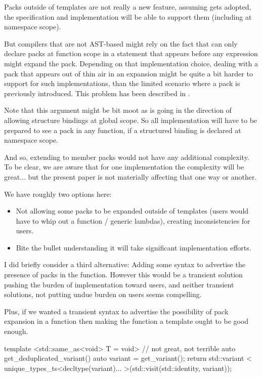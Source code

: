 \documentclass{wg21}
\begin{document}
Packs outside of templates are not really a new feature, assuming  gets adopted, the specification
and implementation will be able to support them (including at namespace scope).

But compilers that are not AST-based might rely on the fact that  can only declare packs at function scope in a statement that appears
before any expression might expand the pack.
Depending on that implementation choice, dealing with a pack that appears out of thin air in an expansion might be quite a bit harder to
support for such implementations, than the limited scenario where a pack is previously introduced.
This problem has been described in .

Note that this argument might be bit moot as  is going in the direction of allowing structure bindings at global scope.
So all implementation will have to be prepared to see a pack in any function, if a structured binding is declared at namespace scope.

And so, extending to member packs would not have any additional complexity.
To be clear, we are aware that for one implementation the complexity will be great... but the present paper is not materially affecting that one way or another.

We have roughly two options here:

\begin{itemize}
\item Not allowing some packs to be expanded outside of templates (users would have to whip out a function / generic lambdas), creating inconsistencies
for users.
\item Bite the bullet understanding it will take significant implementation efforts.
\end{itemize}

I did briefly consider a third alternative: Adding some syntax to advertise the presence of packs in the function.
However this would be a transient solution pushing the burden of implementation toward users, and neither transient solutions,
not putting undue burden on users seems compelling.

Plus, if we wanted a transient syntax to advertise the possibility of pack expansion in a function then making the function a template ought to be good enough.

\begin{colorblock}
template <std::same_as<void> T = void> // not great, not terrible
auto get_deduplicated_variant()  {
    auto variant = get_variant();
    return std::variant <
        unique_types_ts<decltype(variant)...
    >(std::visit(std::identity{}, variant));
}
\end{colorblock}
\end{document}
